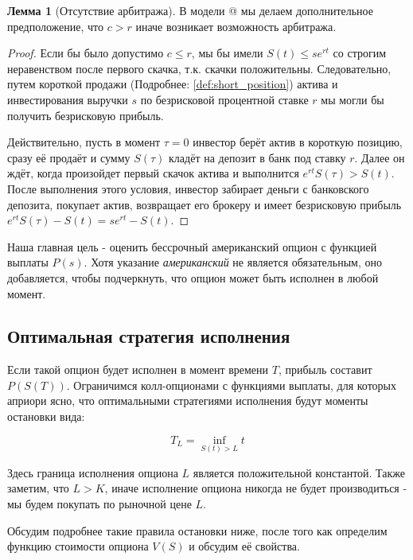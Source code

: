 \documentclass[a4paper,12pt]{article}
\makeatletter
\theoremstyle{definition}
\newtheorem{lemma}{Лемма}
\newcommand*{\rom}[1]{\expandafter\@slowromancap\romannumeral #1@}
\makeatother
\begin{document}
\begin{lemma}[Отсутствие арбитража]\label{thm:no_arbitrage_theoreme}
В модели \rom{2} мы делаем дополнительное предположение, что $c > r$ иначе возникает возможность арбитража. 
\end{lemma}
\begin{proof}
Если бы было допустимо $c \le r$, мы бы имели $S(t) \le s e^{rt}$ со строгим неравенством после первого скачка, т.к. скачки положительны. Следовательно, путем короткой продажи (Подробнее: \ref{def:short_position}) актива и инвестирования выручки $s$ по безрисковой процентной ставке $r$ мы могли бы получить безрисковую прибыль.

Действительно, пусть в момент $\tau = 0$ инвестор берёт актив в короткую позицию, сразу её продаёт и сумму $S(\tau)$ кладёт на депозит в банк под ставку $r$. Далее он ждёт, когда произойдет первый скачок актива и выполнится $e^{rt} S(\tau) > S(t)$. После выполнения этого условия, инвестор забирает деньги с банковского депозита, покупает актив, возвращает его брокеру и имеет безрисковую прибыль $e^{rt}S(\tau) - S(t) = s e^{rt} - S(t)$.
\end{proof}

Наша главная цель - оценить бессрочный американский
опцион с функцией выплаты $P(s)$. Хотя указание \textit{американский} не является обязательным, оно добавляется, чтобы подчеркнуть, что опцион может быть исполнен в любой момент.

\subsection{Оптимальная стратегия исполнения}

Если такой опцион будет исполнен в момент времени $T$, прибыль составит $P(S(T))$. Ограничимся колл-опционами с функциями выплаты, для которых априори ясно, что оптимальными стратегиями исполнения будут моменты остановки вида:

\begin{equation}\label{eq:optimal_excersize}
T_L = \inf\limits_{S(t) > L}{t}
\end{equation}

Здесь граница исполнения опциона $L$ является положительной константой. Также заметим, что $L > K$, иначе исполнение опциона никогда не будет производиться - мы будем покупать по рыночной цене $L$. 

Обсудим подробнее такие правила остановки ниже, после того как определим функцию стоимости опциона $V(S)$ и обсудим её свойства. 
\end{document}
